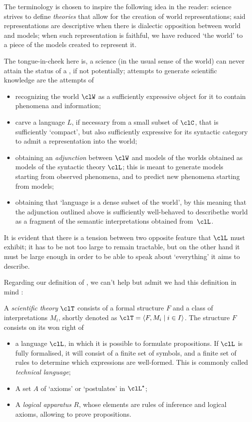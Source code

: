 \begin{remark}\label{remark_yuggoth_2}
The terminology is chosen to inspire the following idea in the reader: science strives to define \emph{theories} that allow for the creation of world representations; said representations are descriptive when there is dialectic opposition between world and models; when such representation is faithful, we have reduced `the world' to a piece of the models created to represent it.

The tongue-in-cheek here is, a science (in the usual sense of the world) can never attain the status of a \science, if not potentially; attempts to generate scientific knowledge are the attempts of
\begin{itemize}
	\item recognizing the world $\clW$ as a sufficiently expressive object for it to contain phenomena and information;
	\item carve a language $L$, if necessary from a small subset of $\clC$, that is sufficiently `compact', but also sufficiently expressive for its syntactic category to admit a representation into the world;
	\item obtaining an \emph{adjunction} between $\clW$ and models of the worlds obtained as models of the syntactic theory $\clL$; this is meant to generate models starting from observed phenomena, and to predict new phenomena starting from models;
	\item obtaining that `language is a dense subset of the world', by this meaning that the adjunction outlined above is sufficiently well-behaved to describethe world as a fragment of the semantic interpretations obtained from~$\clL$.
\end{itemize}
It is evident that there is a tension between two opposite feature that $\clL$ must exhibit; it has to be not too large to remain tractable, but on the other hand it must be large enough in order to be able to speak about `everything' it aims to describe.
\end{remark}
Regarding our definition of \science, we can't help but admit we had this definition in mind \cite[2.1]{biologia}:
\begin{definition*}
	A \emph{scientific theory} $\clT$ consists of a formal structure $F$ and a class of interpretations $M_i$, shortly denoted as $\clT=\langle F,M_i\mid i\in I\rangle$. The structure $F$ consists on its won right of
	\begin{itemize}
		\item a language $\clL$, in which it is possible to formulate propositions. If $\clL$ is fully formalised, it will consist of a finite set of symbols, and a finite set of rules to determine which expressions are well-formed. This is commonly called \emph{technical language};
		\item A set $A$ of `axioms' or `postulates' in $\clL^\star$;
		\item A \emph{logical apparatus} $R$, whose elements are rules of inference and logical axioms, allowing to prove propositions.
	\end{itemize}
\end{definition*}
